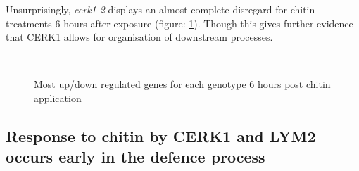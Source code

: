 \documentclass[../main.tex]{subfiles}
\begin{document}
Unsurprisingly, \textit{cerk1-2} displays an almost complete disregard for
chitin treatments 6 hours after exposure (figure: \ref{fig:DEG6}). Though this
gives further evidence that CERK1 allows for organisation of downstream
processes. 


\begin{figure}[!ht]
  \centering
  \\
  \caption{Most up/down regulated genes for each genotype 6 hours post chitin application}
  \label{fig:DEG6}
\end{figure}



\subsection{Response to chitin by CERK1 and LYM2 occurs early in the defence
  process}
\label{sec:resp-chit-cerk1}
\end{document}

